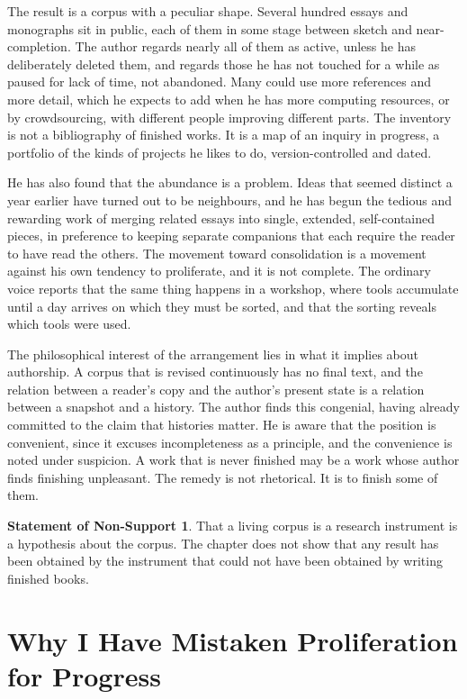 \documentclass[11pt,openany,twoside]{book}
\theoremstyle{plain}
\theoremstyle{definition}
\newtheorem{nonsupport}{Statement of Non-Support}
\theoremstyle{remark}
\begin{document}
The result is a corpus with a peculiar shape. Several hundred essays and monographs sit in public, each of them in some stage between sketch and near-completion. The author regards nearly all of them as active, unless he has deliberately deleted them, and regards those he has not touched for a while as paused for lack of time, not abandoned. Many could use more references and more detail, which he expects to add when he has more computing resources, or by crowdsourcing, with different people improving different parts. The inventory is not a bibliography of finished works. It is a map of an inquiry in progress, a portfolio of the kinds of projects he likes to do, version-controlled and dated.

He has also found that the abundance is a problem. Ideas that seemed distinct a year earlier have turned out to be neighbours, and he has begun the tedious and rewarding work of merging related essays into single, extended, self-contained pieces, in preference to keeping separate companions that each require the reader to have read the others. The movement toward consolidation is a movement against his own tendency to proliferate, and it is not complete. The ordinary voice reports that the same thing happens in a workshop, where tools accumulate until a day arrives on which they must be sorted, and that the sorting reveals which tools were used.

The philosophical interest of the arrangement lies in what it implies about authorship. A corpus that is revised continuously has no final text, and the relation between a reader's copy and the author's present state is a relation between a snapshot and a history. The author finds this congenial, having already committed to the claim that histories matter. He is aware that the position is convenient, since it excuses incompleteness as a principle, and the convenience is noted under suspicion. A work that is never finished may be a work whose author finds finishing unpleasant. The remedy is not rhetorical. It is to finish some of them.

\begin{nonsupport}
That a living corpus is a research instrument is a hypothesis about the corpus. The chapter does not show that any result has been obtained by the instrument that could not have been obtained by writing finished books.
\end{nonsupport}

\chapter{Why I Have Mistaken Proliferation for Progress}
\end{document}

